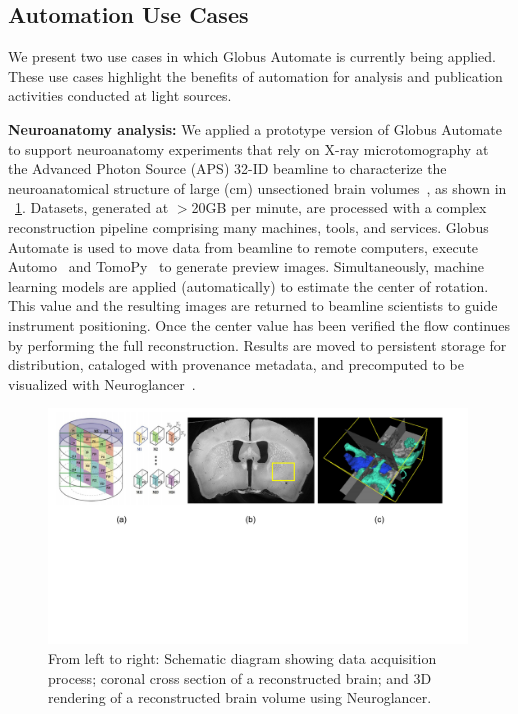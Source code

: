 \documentclass{aip-cp}
\begin{document}
\subsection{Automation Use Cases}

We present two use cases in which Globus Automate is currently being applied. These
use cases highlight the benefits of automation for analysis and publication activities
conducted at light sources.

\textbf{Neuroanatomy analysis:} We applied a prototype version of Globus Automate
to support neuroanatomy experiments that rely on
X-ray microtomography at the Advanced Photon Source (APS) 32-ID beamline to
characterize the neuroanatomical structure of large (cm) unsectioned brain 
volumes~\cite{kasthuri2015saturated}, as shown in \figurename{~\ref{fig:brains}}. 
Datasets, generated at $>$20GB per minute, are processed
with a complex reconstruction pipeline 
comprising many machines, tools, and services.  
Globus Automate is used to move data from beamline to remote computers,
execute Automo~\cite{Automo} and TomoPy~\cite{gursoy2014tomopy} 
to generate preview images. Simultaneously, machine learning models
are applied (automatically) to estimate the center of rotation. This value and the resulting 
images are returned to beamline scientists to guide instrument positioning. Once the center value 
has been verified the flow continues by performing the full reconstruction. Results are moved to 
persistent storage for distribution, cataloged with
provenance metadata, and precomputed to be visualized with Neuroglancer~\cite{Neuroglancer}. 

\begin{figure}[t!]
	\centering
	\includegraphics[trim={0.7cm 8.6cm 1.5cm 0cm},clip,width=0.99\textwidth]{Figs/brains.pdf}
	\caption{From left to right: Schematic diagram showing data acquisition process;
	coronal cross section of a reconstructed brain; and
	3D rendering of a reconstructed brain volume using Neuroglancer.}
	\label{fig:brains}
\end{figure}
\end{document}
